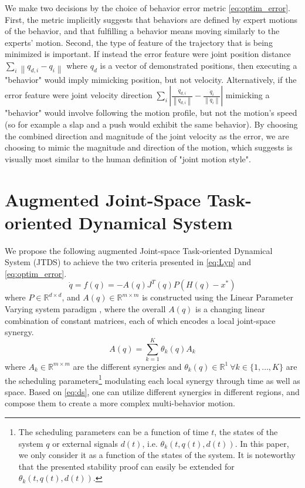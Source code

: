 \documentclass[letterpaper, 10 pt, conference,fleqn]{ieeeconf}
\begin{document}
We make two decisions by the choice of behavior error metric \eqref{eq:optim_error}. First, the metric implicitly suggests that behaviors are defined by expert motions of the behavior, and that fulfilling a behavior means moving similarly to the experts' motion. Second, the type of feature of the trajectory that is being minimized is important. If instead the error feature were joint position distance $\sum_i\left \| q_{d,i} - q_i \right \|$ where $q_d$ is a vector of demonstrated positions, then executing a "behavior" would imply mimicking position, but not velocity. Alternatively, if the error feature were joint velocity direction $\sum_i \left | \frac{\dot{q}_{d,i}}{\left \| \dot{q}_{d,i} \right \|} - \frac{\dot{q}_i}{\left \| \dot{q}_i \right \|} \right |$ mimicking a "behavior" would involve following the motion profile, but not the motion's speed (so for example a slap and a push would exhibit the same behavior). By choosing the combined direction and magnitude of the joint velocity as the error, we are choosing to mimic the magnitude and direction of the motion, which \cite{gielniak2010stylized} suggests is visually most similar to the human definition of "joint motion style".
\section{Augmented \textbf{J}oint-Space \textbf{T}ask-oriented \textbf{D}ynamical \textbf{S}ystem} \label{Sec:DS}
\label{sec:proposed_system}
We propose the following augmented Joint-space Task-oriented Dynamical System (JTDS) to achieve the two criteria presented in \ref{eq:Lyp} and \ref{eq:optim_error}.
\begin{equation}
\label{eq:ds}
\dot{q} = f(q) = -A(q)J^T(q)P(H(q) - x^*)
\end{equation}
where $P\in \mathbb{R}^{d\times d}$, and $A(q)\in \mathbb{R}^{m\times m}$ is constructed using the Linear Parameter Varying system paradigm \cite{emedi2016fixed,7439839}, where the overall $A(q)$ is a changing linear combination of constant  matrices, each of which encodes a local joint-space synergy. 
\begin{equation}
\label{eq:A_def}
A(q) = \sum_{k=1}^{K}\theta_k(q)A_k 
\end{equation}
where $A_k\in \mathbb{R}^{m\times m} $ are the different synergies and $\theta_k(q)\in \mathbb{R}^{1}~\forall k\in\{1,\dots,K\} $ are the scheduling parameters\footnote{The scheduling parameters can be a function of time $t$, the states of the
system $q $ or external signals $d(t)$, i.e. $\theta_k (t, q(t), d(t))$. In this paper, we only consider it as a function of the states of the system. It is noteworthy that the presented stability proof can easily be extended for $\theta_k (t, q(t), d(t))$.} modulating each local synergy through time as well as space. Based on \eqref{eq:ds}, one can utilize different synergies in different regions, and compose them to create a more complex multi-behavior motion.
\end{document}

